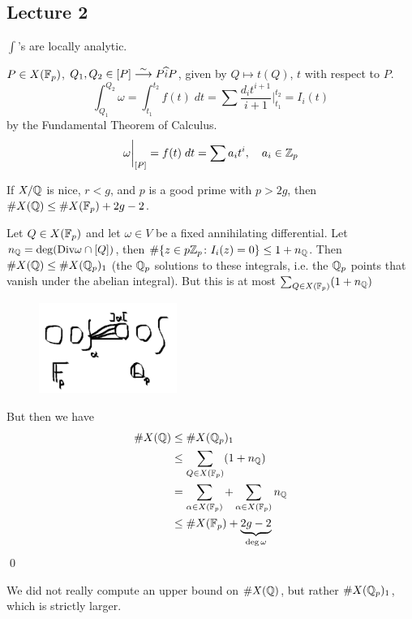 \newpage
\subsection{Lecture 2}

$\int$'s are locally analytic.

$P \in X(\mathbb{F}_p)$, $Q_1,Q_2 \in [P] \stackrel{\sim}{\longrightarrow} P \widehat{i} P$, given by $Q \mapsto t(Q)$, $t$ with respect to $P$.
	\[
	\int_{Q_1}^{Q_2} \omega= \int_{t_1}^{t_2} f(t) \;dt= \sum \dfrac{d_i t^{i+1}}{i+1} \bigg|_{t_1}^{t_2}= I_i(t)
	\]
by the Fundamental Theorem of Calculus.
	\[
	\omega \bigg|_{[P]}= f(t) \;dt= \sum a_i t^i, \quad a_i \in \mathbb{Z}_p
	\]


\begin{thm}[Coleman]
If $X/\mathbb{Q}$ is nice, $r<g$, and $p$ is a good prime with $p> 2g$, then $\#X(\mathbb{Q}) \leq \#X(\mathbb{F}_p) + 2g-2$.
\end{thm}


\pf Let $Q \in X(\mathbb{F}_p)$ and let $\omega \in V$ be a fixed annihilating differential. Let $n_{\mathbb{Q}}= \deg(\text{Div} \omega \cap [Q])$, then $\#\{z \in p \mathbb{Z}_p \colon I_i(z)=0 \} \leq 1+ n_{\mathbb{Q}}$. Then $\#X(\mathbb{Q}) \leq \#X(\mathbb{Q}_p)_1$ (the $\mathbb{Q}_p$ solutions to these integrals, i.e. the $\mathbb{Q}_p$ points that vanish under the abelian integral). But this is at most $\sum_{Q \in X(\mathbb{F}_p)} (1+ n_{\mathbb{Q}})$


	\begin{figure}[!ht]
	\centering
	\includegraphics[width=0.4\textwidth]{../images/im6.png}
	\end{figure}


But then we have
	\[
	\begin{aligned}
	\#X(\mathbb{Q}) &\leq \#X(\mathbb{Q}_p)_1 \\
	&\leq \sum_{Q \in X(\mathbb{F}_p)} (1+ n_{\mathbb{Q}}) \\
	&= \sum_{\alpha \in X(\mathbb{F}_p)} + \sum_{\alpha \in X(\mathbb{F}_p)} n_{\mathbb{Q}} \\
	&\leq \#X(\mathbb{F}_p) + \underbrace{2g-2}_{\deg \omega} 
	\end{aligned}
	\]
\qed \\


\begin{rem}
We did not really compute an upper bound on $\#X(\mathbb{Q})$, but rather $\#X(\mathbb{Q}_p)_1$, which is strictly larger. 
\end{rem}


